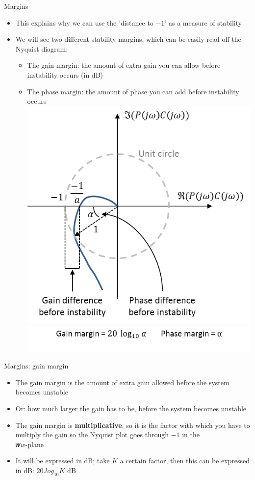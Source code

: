\begin{frame}{Margins}
\begin{itemize}
\item This explains why we can use the 'distance to $-1$' as a measure of stability
\item We will see two different stability margins, which can be easily read off the Nyquist diagram:
\begin{itemize}
\item The gain margin: the amount of extra gain you can allow before instability occurs (in dB)
\item The phase margin: the amount of phase you can add before instability occurs
\\ \includegraphics[width= 0.4\linewidth]{Afbeelding17}
\\ \includegraphics[width=0.4\linewidth]{Afbeelding18}
\end{itemize}
\end{itemize}
\end {frame}

\begin{frame}{Margins: gain margin}
\begin{itemize}
\item The gain margin is the amount of extra gain allowed before the system becomes unstable
\item Or: how much larger the gain has to be, before the system becomes unstable
\item The gain margin is \textbf{multiplicative}, so it is the factor with which you have to multiply the gain so the Nyquist plot goes through $-1$ in the\\𝑤$w$-plane
\item It will be expressed in dB; take $K$ a certain factor, then this can be expressed in dB: $20.log_{10} K$ dB 
\end{itemize}
\end {frame}

